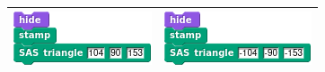 \documentclass[noauthor,nooutcomes,12pt,hints,handout]{ximera}
\begin{document}
\begin{question}
\begin{freeResponse}
\begin{enumerate}
\begin{center}
\begin{tabular}{|c||c|}
      \includegraphics{SASstampScriptIII.png} & \includegraphics{SASstampScriptIV.png} \\\hline
    \end{tabular}
  \end{center}
    \end{enumerate}
  \end{freeResponse}
\end{question}
\mynewpage
\end{document}
